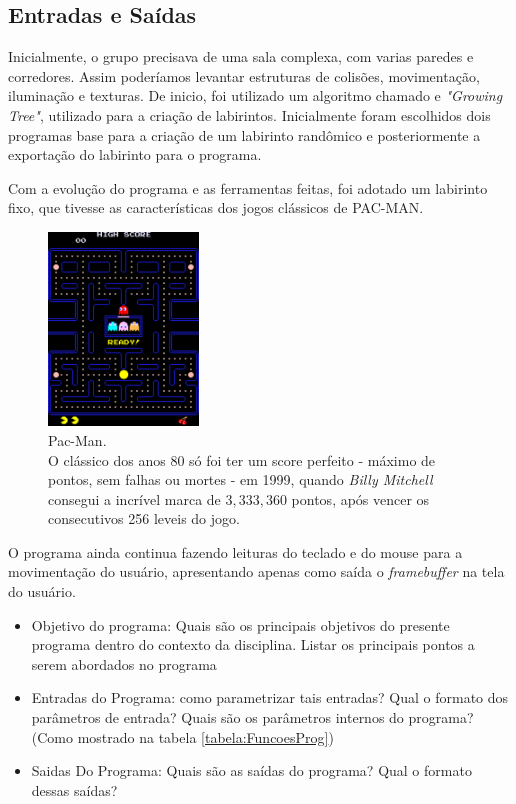 \subsection{Entradas e Saídas}\label{inputs}

Inicialmente, o grupo precisava de uma sala complexa, com varias paredes e corredores. Assim poderíamos levantar estruturas de colisões, movimentação, iluminação e texturas. De inicio, foi utilizado um algoritmo chamado e \textit{"Growing Tree"}, utilizado para a criação de labirintos. Inicialmente foram escolhidos dois programas base para a criação de um labirinto randômico e posteriormente a exportação do labirinto para o programa.

Com a evolução do programa e as ferramentas feitas, foi adotado um labirinto fixo, que tivesse as características dos jogos clássicos de PAC-MAN.

\begin{figure} %
  \centering
  \includegraphics[width=4cm]{./fts/lvl1}
  \caption{Pac-Man.\\O clássico dos anos 80 só foi ter um score perfeito - máximo de pontos, sem falhas ou mortes - em 1999, quando \textit{Billy Mitchell} consegui a incrível marca de $3,333,360$ pontos, após vencer os consecutivos 256 leveis do jogo.}
  \label{pac1}
\end{figure}

O programa ainda continua fazendo leituras do teclado e do mouse para a movimentação do usuário, apresentando apenas como saída o \textit{framebuffer} na tela do usuário.




\begin{itemize}
	\item Objetivo do programa: Quais são os principais objetivos do presente programa dentro do contexto da disciplina. Listar os principais pontos a serem abordados no programa
	\item Entradas do Programa: como parametrizar tais entradas? Qual o formato dos parâmetros de entrada? Quais são os parâmetros internos do programa?(Como mostrado na tabela \ref{tabela:FuncoesProg})
	\item Saidas Do Programa: Quais são as saídas do programa? Qual o formato dessas saídas?
\end{itemize}

